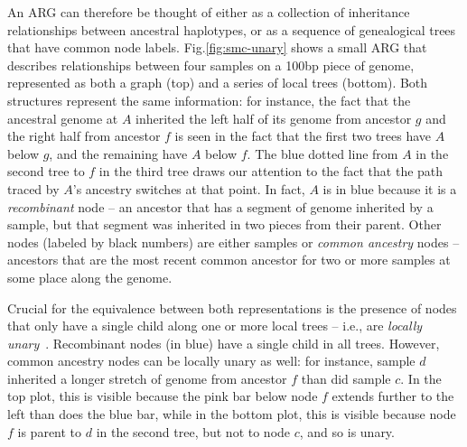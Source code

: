 \documentclass{article}
\begin{document}
An ARG can therefore be thought of either as a collection of inheritance
relationships between ancestral haplotypes,
or as a sequence of genealogical trees that have common node labels.
Fig.\ref{fig:smc-unary} shows a small ARG
that describes relationships between four samples on a 100bp piece of genome,
represented as both a graph (top) and a series of local trees (bottom).
Both structures represent the same information:
for instance, the fact that the ancestral genome at $A$
inherited the left half of its genome from ancestor $g$
and the right half from ancestor $f$
is seen in the fact that the first two trees have $A$ below $g$,
and the remaining have $A$ below $f$.
The blue dotted line from $A$ in the second tree to $f$ in the third tree
draws our attention to the fact that
the path traced by $A$'s ancestry switches at that point.
In fact, $A$ is in blue because it is a \emph{recombinant} node --
an ancestor that has a segment of genome inherited by a sample,
but that segment was inherited in two pieces from their parent.
Other nodes (labeled by black numbers) are either samples
or \emph{common ancestry} nodes --
ancestors that are the most recent common ancestor for two 
or more samples
at some place along the genome.

Crucial for the equivalence between both representations is the presence of
nodes that only have a single child along one or more local trees --
i.e., are \emph{locally unary}~\citep{wong_general_2023}.
Recombinant nodes (in blue) have a single child in all trees.
However, common ancestry nodes can be locally unary as well:
for instance, sample $d$ inherited a longer stretch of genome from ancestor $f$
than did sample $c$.
In the top plot, this is visible because the pink bar below node $f$
extends further to the left than does the blue bar,
while in the bottom plot, this is visible because node $f$ is parent to $d$
in the second tree, but not to node $c$, and so is unary.
\end{document}
